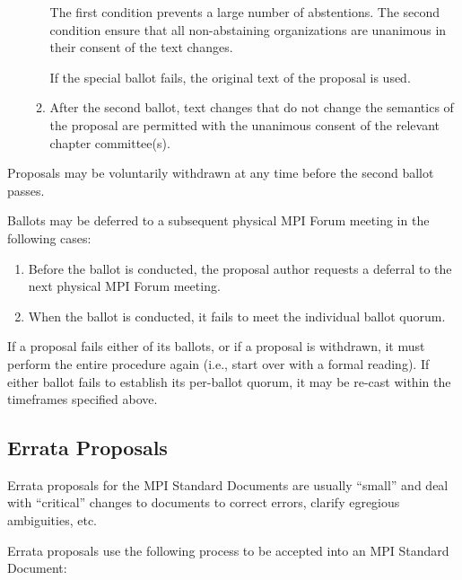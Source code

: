 \begin{enumerate}
\begin{enumerate}
    \begin{rationale}
      The first condition prevents a large number of abstentions.
      The second condition ensure that all non-abstaining
      organizations are unanimous in their consent of the text
      changes.
    \end{rationale}

    If the special ballot fails, the original text of the proposal
    is used.

  \item After the second ballot, text changes that do not change the
    semantics of the proposal are permitted with the unanimous consent
    of the relevant chapter committee(s).
  \end{enumerate}
\end{enumerate}

Proposals may be voluntarily withdrawn at any time before the second
ballot passes.

Ballots may be deferred to a subsequent physical MPI Forum meeting in
the following cases:

\begin{enumerate}
\item Before the ballot is conducted, the proposal author requests a
  deferral to the next physical MPI Forum meeting.
\item When the ballot is conducted, it fails to meet the individual
  ballot quorum.
\end{enumerate}

If a proposal fails either of its ballots, or if a proposal is
withdrawn, it must perform the entire procedure again (i.e., start
over with a formal reading).  If either ballot fails to establish its
per-ballot quorum, it may be re-cast within the timeframes specified
above.


\subsection{Errata Proposals}

Errata proposals for the MPI Standard Documents are usually ``small''
and deal with ``critical'' changes to documents to correct errors,
clarify egregious ambiguities, etc.

Errata proposals use the following process to be accepted into an MPI
Standard Document:

